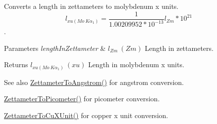 Converts a length in zettameters to molybdenum x units. \[ l_{xu(Mo\ K\alpha_1)}=\frac{1}{1.00209952*10^{-13}} l_{Zm} * 10^{21}\]. 


\begin{DoxyParams}{Parameters}
{\em length\+In\+Zettameter} & $ l_{Zm}\ (Zm)$ Length in zettameters. \\
\hline
\end{DoxyParams}
\begin{DoxyReturn}{Returns}
$ l_{xu(Mo\ K\alpha_1)}\ (xu)$ Length in molybdenum x units. 
\end{DoxyReturn}
\begin{DoxySeeAlso}{See also}
\mbox{\hyperlink{group___e_g_x_math-_conversions-_length_conversions-_zettameter-_non-_s_i_ga49d813ff9592fc1fc9a184436d0849fc}{Zettameter\+To\+Angstrom()}} for angstrom conversion. 

\mbox{\hyperlink{group___e_g_x_math-_conversions-_length_conversions-_zettameter-_s_i_gae7835234c6727bbfd1e9ad40c54a4740}{Zettameter\+To\+Picometer()}} for picometer conversion. 

\mbox{\hyperlink{group___e_g_x_math-_conversions-_length_conversions-_zettameter-_non-_s_i_ga91f2890d91086a45ad9d2b5e7e82b60a}{Zettameter\+To\+Cu\+X\+Unit()}} for copper x unit conversion. 
\end{DoxySeeAlso}
